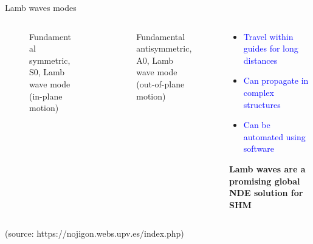 \documentclass[10pt,aspectratio=169,dvipsnames]{beamer} %
\begin{document}
	\setcounter{subfigure}{0}
	\begin{frame}{Lamb waves modes}
		\begin{columns}[T]
			\begin{column}{0.3\textwidth}
				\centering
				\begin{figure}
					\caption{Fundamental symmetric, S0, \alert{Lamb wave} mode (in-plane motion)}
				\end{figure}
			\end{column}
			\begin{column}{0.3\textwidth}
				\centering
				\begin{figure}
					\caption{Fundamental antisymmetric, A0, \alert{Lamb wave} mode (out-of-plane motion)}
				\end{figure}
			\end{column}
			\hfill
			\begin{column}{0.37\textwidth}
				\begin{itemize}
					\item \textcolor{blue}{Travel within guides for long distances}
					\item \textcolor{blue}{Can propagate in complex structures}
					\item \textcolor{blue}{Can be automated using software}
				\end{itemize}
				\textbf{Lamb waves are a promising global NDE solution for SHM}
			\end{column}
		\end{columns}	
		\tiny 
		(source: https://nojigon.webs.upv.es/index.php)
	\end{frame}
\end{document}
